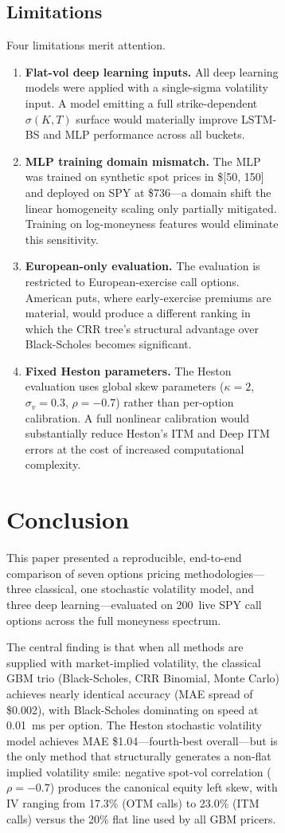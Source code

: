 \documentclass[12pt,a4paper]{article}
\begin{document}
\begin{figure}[H]
\begin{figure}[H]
\subsection{Limitations}

Four limitations merit attention.

\begin{enumerate}
  \item \textbf{Flat-vol deep learning inputs.}
    All deep learning models were applied with a single-sigma volatility input.
    A model emitting a full strike-dependent $\sigma(K, T)$ surface would
    materially improve LSTM-BS and MLP performance across all buckets.
  \item \textbf{MLP training domain mismatch.}
    The MLP was trained on synthetic spot prices in \$[50, 150] and deployed on
    SPY at \$736---a domain shift the linear homogeneity scaling only partially
    mitigated.
    Training on log-moneyness features would eliminate this sensitivity.
  \item \textbf{European-only evaluation.}
    The evaluation is restricted to European-exercise call options.
    American puts, where early-exercise premiums are material, would produce a
    different ranking in which the CRR tree's structural advantage over
    Black-Scholes becomes significant.
  \item \textbf{Fixed Heston parameters.}
    The Heston evaluation uses global skew parameters ($\kappa=2$,
    $\sigma_v=0.3$, $\rho=-0.7$) rather than per-option calibration.
    A full nonlinear calibration would substantially reduce Heston's ITM
    and Deep ITM errors at the cost of increased computational complexity.
\end{enumerate}

\section{Conclusion}
\label{sec:conclusion}

This paper presented a reproducible, end-to-end comparison of seven options
pricing methodologies—three classical, one stochastic volatility model, and
three deep learning—evaluated on 200~live SPY call options across the full
moneyness spectrum.

The central finding is that when all methods are supplied with market-implied
volatility, the classical GBM trio (Black-Scholes, CRR Binomial, Monte Carlo)
achieves nearly identical accuracy (MAE spread of \$0.002), with Black-Scholes
dominating on speed at 0.01~ms per option.
The Heston stochastic volatility model achieves MAE \$1.04---fourth-best
overall---but is the only method that structurally generates a non-flat implied
volatility smile: negative spot-vol correlation ($\rho=-0.7$) produces the
canonical equity left skew, with IV ranging from 17.3\% (OTM calls) to
23.0\% (ITM calls) versus the 20\% flat line used by all GBM pricers.


\end{figure}
\end{figure}
\end{document}
